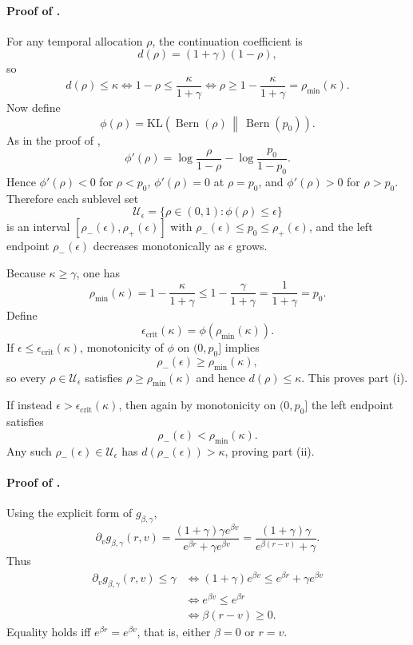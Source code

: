 \documentclass{article}
\theoremstyle{remark}
\DeclareMathOperator{\Bern}{Bern}
\newcommand{\KL}{\mathrm{KL}}
\newcommand{\pprior}{p_0}
\newcommand{\KLbin}[2]{\KL\!\left(\Bern(#1)\,\middle\|\,\Bern(#2)\right)}
\begin{document}
\paragraph{Proof of .}
For any temporal allocation $\rho$, the continuation coefficient is
\[
d(\rho)=(1+\gamma)(1-\rho),
\]
so
\[
d(\rho)\le \kappa
\iff
1-\rho\le \frac{\kappa}{1+\gamma}
\iff
\rho\ge 1-\frac{\kappa}{1+\gamma}=\rho_{\min}(\kappa).
\]
Now define
\[
\phi(\rho)=\KLbin{\rho}{\pprior}.
\]
As in the proof of ,
\[
\phi'(\rho)=\log\frac{\rho}{1-\rho}-\log\frac{\pprior}{1-\pprior}.
\]
Hence $\phi'(\rho)<0$ for $\rho<\pprior$, $\phi'(\rho)=0$ at $\rho=\pprior$, and $\phi'(\rho)>0$ for $\rho>\pprior$. Therefore each sublevel set
\[
\mathcal U_\epsilon=\{\rho\in(0,1):\phi(\rho)\le \epsilon\}
\]
is an interval $[\rho_-(\epsilon),\rho_+(\epsilon)]$ with $\rho_-(\epsilon)\le \pprior\le \rho_+(\epsilon)$, and the left endpoint $\rho_-(\epsilon)$ decreases monotonically as $\epsilon$ grows.

Because $\kappa\ge \gamma$, one has
\[
\rho_{\min}(\kappa)=1-\frac{\kappa}{1+\gamma}\le 1-\frac{\gamma}{1+\gamma}=\frac{1}{1+\gamma}=\pprior.
\]
Define
\[
\epsilon_{\mathrm{crit}}(\kappa)=\phi(\rho_{\min}(\kappa)).
\]
If $\epsilon\le \epsilon_{\mathrm{crit}}(\kappa)$, monotonicity of $\phi$ on $(0,\pprior]$ implies
\[
\rho_-(\epsilon)\ge \rho_{\min}(\kappa),
\]
so every $\rho\in\mathcal U_\epsilon$ satisfies $\rho\ge \rho_{\min}(\kappa)$ and hence $d(\rho)\le \kappa$. This proves part (i).

If instead $\epsilon>\epsilon_{\mathrm{crit}}(\kappa)$, then again by monotonicity on $(0,\pprior]$ the left endpoint satisfies
\[
\rho_-(\epsilon)<\rho_{\min}(\kappa).
\]
Any such $\rho_-(\epsilon)\in\mathcal U_\epsilon$ has $d(\rho_-(\epsilon))>\kappa$, proving part (ii).

\paragraph{Proof of .}
Using the explicit form of $g_{\beta,\gamma}$,
\[
\partial_v g_{\beta,\gamma}(r,v)=\frac{(1+\gamma)\gamma e^{\beta v}}{e^{\beta r}+\gamma e^{\beta v}}=\frac{(1+\gamma)\gamma}{e^{\beta(r-v)}+\gamma}.
\]
Thus
\begin{align*}
\partial_v g_{\beta,\gamma}(r,v)\le \gamma
&\iff (1+\gamma)e^{\beta v}\le e^{\beta r}+\gamma e^{\beta v}\\
&\iff e^{\beta v}\le e^{\beta r}\\
&\iff \beta(r-v)\ge 0.
\end{align*}
Equality holds iff $e^{\beta r}=e^{\beta v}$, that is, either $\beta=0$ or $r=v$.
\end{document}
